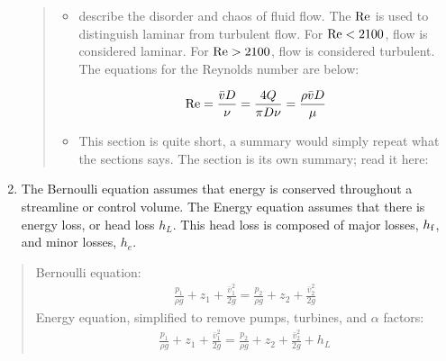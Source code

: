 \documentclass[letterpaper,10pt,english]{sphinxmanual}
\begin{document}
\begin{enumerate}
\begin{quote}
\begin{itemize}
\item {} 
 describe the disorder and chaos of fluid flow. The  \({\rm Re}\) is used to distinguish laminar from turbulent flow. For \({\rm Re} < 2100\), flow is considered laminar. For \({\rm Re} > 2100\), flow is considered turbulent. The equations for the Reynolds number are below:

\end{itemize}
\begin{equation}\label{equation:Review/Review_Fluid_Mechanics:Review/Review_Fluid_Mechanics:30}
\begin{split}{\rm Re} = \frac{\bar vD}{\nu} = \frac{4Q}{\pi D\nu} = \frac{\rho \bar vD}{\mu}\end{split}
\end{equation}\begin{itemize}
\item {} 
 This section is quite short, a summary would simply repeat what the sections says. The section is its own summary; read it here: {\hyperref[\detokenize{Review/Review_Fluid_Mechanics:streamlines-and-control-volumes}]{}}

\end{itemize}
\end{quote}

\item {} 
 The Bernoulli equation assumes that energy is conserved throughout a streamline or control volume. The Energy equation assumes that there is energy loss, or head loss \(h_L\). This head loss is composed of major losses, \(h_{\rm{f}}\), and minor losses, \(h_e\).

\end{enumerate}
\begin{quote}

Bernoulli equation:
\begin{equation}\label{equation:Review/Review_Fluid_Mechanics:Review/Review_Fluid_Mechanics:31}
\begin{split}\frac{p_1}{\rho g} + {z_1} + \frac{\bar v_1^2}{2g} = \frac{p_2}{\rho g} + {z_2} + \frac{\bar v_2^2}{2g}\end{split}
\end{equation}
Energy equation, simplified to remove pumps, turbines, and \(\alpha\) factors:
\begin{equation}\label{equation:Review/Review_Fluid_Mechanics:Review/Review_Fluid_Mechanics:32}
\begin{split}\frac{p_{1}}{\rho g} + z_{1} + \frac{\bar v_{1}^2}{2g} = \frac{p_{2}}{\rho g} + z_{2} + \frac{\bar v_{2}^2}{2g} + h_L\end{split}
\end{equation}\end{quote}
\end{document}
